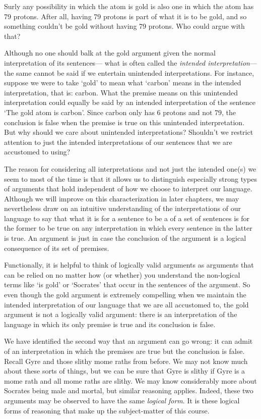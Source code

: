 Surly any possibility in which the atom is gold is also one in which the atom has 79 protons.
After all, having 79 protons is part of what it is to be gold, and so something couldn't be gold without having 79 protons.
Who could argue with that?

Although no one should balk at the gold argument given the normal interpretation of its sentences--- what is often called the \textit{intended interpretation}--- the same cannot be said if we entertain unintended interpretations.
For instance, suppose we were to take `gold' to mean what `carbon' means in the intended interpretation, that is: carbon.
What the premise means on this unintended interpretation could equally be said by an intended interpretation of the sentence `The gold atom is carbon'.
Since carbon only has 6 protons and not 79, the conclusion is false when the premise is true on this unintended interpretation.
But why should we care about unintended interpretations?
Shouldn't we restrict attention to just the intended interpretations of our sentences that we are accustomed to using?

The reason for considering all interpretations and not just the intended one(s) we seem to most of the time is that it allows us to distinguish especially strong types of arguments that hold independent of how we choose to interpret our language.
Although we will improve on this characterization in later chapters, we may nevertheless draw on an intuitive understanding of the interpretations of our language to say that what it is for a sentence to be a  of a set of sentences is for the former to be true on any interpretation in which every sentence in the latter is true. 
An argument is  just in case the conclusion of the argument is a logical consequence of its set of premises.

Functionally, it is helpful to think of logically valid arguments as arguments that can be relied on no matter how (or whether) you understand the non-logical terms like `is gold' or `Socrates' that occur in the sentences of the argument.
So even though the gold argument is extremely compelling when we maintain the intended interpretation of our language that we are all accustomed to, the gold argument is not a logically valid argument: there is an interpretation of the language in which its only premise is true and its conclusion is false.

We have identified the second way that an argument can go wrong: it can admit of an interpretation in which the premises are true but the conclusion is false.
Recall Gyre and those slithy mome raths from before.
We may not know much about these sorts of things, but we can be sure that Gyre is slithy if Gyre is a mome rath and all mome raths are slithy.
We may know considerably more about Socrates being male and mortal, but similar reasoning applies.
Indeed, these two arguments may be observed to have the same \textit{logical form}.
It is these logical forms of reasoning that make up the subject-matter of this course.

